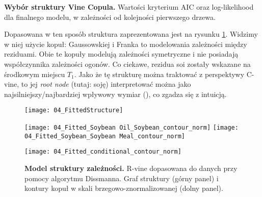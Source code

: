 \begin{table}
	\centering
	
	\caption{\textbf{Wybór struktury Vine Copula.} Wartości kryterium AIC oraz log-likelihood dla finalnego modelu, w zależności od kolejności pierwszego drzewa. \label{tab:vine_selection}}
\end{table}

Dopasowana w ten sposób struktura zaprezentowana jest na rysunku \ref{fig:vine_fit}. Widzimy w niej użycie kopuł: Gaussowskiej i Franka to modelowania zależności między reziduami. Obie te kopuły modelują zależności symetryczne i nie posiadają współczynnika zależności ogonów. Co ciekawe, rezidua soi zostały wskazane na środkowym miejscu $T_1$. Jako że tę strukturę można traktować z perspektywy C-vine, to jej \emph{root node} (tutaj: soję) interpretować można jako najsilniejszy/najbardziej wpływowy wymiar (\cite{Czado_Vine_Copulas}), co zgadza się z intuicją.\\

\begin{figure}[h]
	\centering
	\texttt{[image: 04\_FittedStructure]}
	\medskip
	\begin{minipage}{\linewidth}
		\texttt{[image: 04\_Fitted\_Soybean Oil\_Soybean\_contour\_norm]}
		\texttt{[image: 04\_Fitted\_Soybean\_Soybean Meal\_contour\_norm]}
	\end{minipage}
	\begin{minipage}{\linewidth}
		\centering
		\texttt{[image: 04\_Fitted\_conditional\_contour\_norm]}
	\end{minipage}
	\caption{\textbf{Model struktury zależności.} R-vine dopasowana do danych przy pomocy algorytmu Dissmanna. Graf struktury (górny panel) i kontury kopuł w skali brzegowo-znormalizowanej (dolny panel). \label{fig:vine_fit}}
\end{figure}
